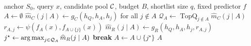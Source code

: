\begin{algorithm}[t]
\caption{Response-Aware Marginal-Utility Routing}
\label{alg:rmur}
\begin{algorithmic}[1]
\Require anchor $S_0$, query $x$, candidate pool $\mathcal{C}$, budget $B$, shortlist size $q$, fixed predictor $f$
\State $A \gets \emptyset$
  \State $\widehat m_C(j\mid A) \gets g_C(h_Q,h_A,h_j)$ for all $j\notin A$ 
  \State $\mathcal Q_A \gets \operatorname*{TopQ}_{j\notin A}\widehat m_C(j\mid A)$
    \State $r_{A,j} \gets \psi(f_A(x), f_{A\cup\{j\}}(x))$ 
    \State $\widehat m_R(j\mid A) \gets g_R(h_Q,h_A,h_j,r_{A,j})$
  \EndFor
  \State $j^\star \gets \operatorname*{arg\,max}_{j\in\mathcal Q_A}\widehat m_R(j\mid A)$
    \State \textbf{break} 
  \EndIf
  \State $A \gets A\cup\{j^\star\}$
\EndWhile
\State \Return $A$
\end{algorithmic}
\end{algorithm}
